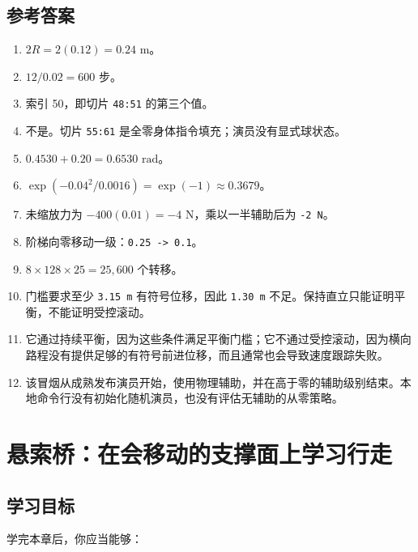 \documentclass[
  chinese,
  11pt,
  letterpaper,
]{article}
\providecommand{\tightlist}{%
  \setlength{\itemsep}{0pt}\setlength{\parskip}{0pt}}
\begin{document}
\subsection{参考答案}\label{ux53c2ux8003ux7b54ux6848}

\begin{enumerate}
\def\labelenumi{\arabic{enumi}.}
\tightlist
\item
  \(2R=2(0.12)=0.24\text{ m}\)。
\item
  \(12/0.02=600\) 步。
\item
  索引 50，即切片 \texttt{48:51} 的第三个值。
\item
  不是。切片 \texttt{55:61} 是全零身体指令填充；演员没有显式球状态。
\item
  \(0.4530+0.20=0.6530\text{ rad}\)。
\item
  \(\exp(-0.04^2/0.0016)=\exp(-1)\approx0.3679\)。
\item
  未缩放力为 \(-400(0.01)=-4\text{ N}\)，乘以一半辅助后为
  \texttt{-2\ N}。
\item
  阶梯向零移动一级：\texttt{0.25\ -\textgreater{}\ 0.1}。
\item
  \(8\times128\times25=25{,}600\) 个转移。
\item
  门槛要求至少 \texttt{3.15\ m} 有符号位移，因此 \texttt{1.30\ m}
  不足。保持直立只能证明平衡，不能证明受控滚动。
\item
  它通过持续平衡，因为这些条件满足平衡门槛；它不通过受控滚动，因为横向路程没有提供足够的有符号前进位移，而且通常也会导致速度跟踪失败。
\item
  该冒烟从成熟发布演员开始，使用物理辅助，并在高于零的辅助级别结束。本地命令行没有初始化随机演员，也没有评估无辅助的从零策略。
\end{enumerate}

\section{悬索桥：在会移动的支撑面上学习行走}\label{ux60acux7d22ux6865ux5728ux4f1aux79fbux52a8ux7684ux652fux6491ux9762ux4e0aux5b66ux4e60ux884cux8d70}

\subsection{学习目标}\label{ux5b66ux4e60ux76eeux6807-1}

学完本章后，你应当能够：
\end{document}
